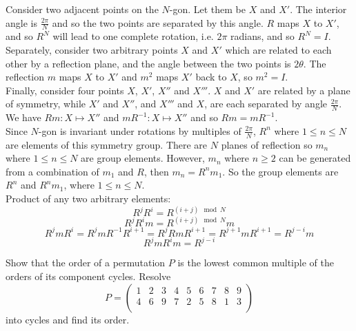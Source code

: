 \documentclass[a4paper]{article}
\begin{document}
\begin{ans}
Consider two adjacent points on the $N$-gon. Let them be $X$ and $X'$. The interior angle is $\frac{2\pi}{N}$ and so the two points are separated by this angle. $R$ maps $X$ to $X'$, and so $R^N$ will lead to one complete rotation, i.e. $2\pi$ radians, and so $R^N=I$.\\[5pt]
Separately, consider two arbitrary points $X$ and $X'$ which are related to each other by a reflection plane, and the angle between the two points is $2\theta$. The reflection $m$ maps $X$ to $X'$ and $m^2$ maps $X'$ back to $X$, so $m^2=I$.\\[5pt]
Finally, consider four points $X$, $X'$, $X''$ and $X'''$. $X$ and $X'$ are related by a plane of symmetry, while $X'$ and $X''$, and $X'''$ and $X$, are each separated by angle $\frac{2\pi}{N}$. We have $Rm: X\mapsto X''$ and $mR^{-1}:X\mapsto X''$ and so $Rm=mR^{-1}$.\\[5pt]
Since $N$-gon is invariant under rotations by multiples of $\frac{2\pi}{N}$, $R^n$ where $1\leq n\leq N$ are elements of this symmetry group. There are $N$ planes of reflection so $m_n$ where $1\leq n\leq N$ are group elements. However, $m_n$ where $n\geq2$ can be generated from a combination of $m_1$ and $R$, then $m_n=R^nm_1$. So the group elements are $R^n$ and $R^nm_1$, where $1\leq n\leq N$.\\[5pt]
Product of any two arbitrary elements: 
$$R^jR^i=R^{(i+j)\mod N}$$
$$R^jR^im=R^{(i+j)\mod N}m$$
$$R^jmR^i=R^jmR^{-1}R^{i+1}=R^jRmR^{i+1}=R^{j+1}mR^{i+1}=R^{j-i}m$$
$$R^jmR^im=R^{j-i}$$
\end{ans}
\begin{qns}[Permutation]
Show that the order of a permutation $P$ is the lowest common multiple of the orders of its component cycles. Resolve
$$P=\begin{pmatrix}1&2&3&4&5&6&7&8&9\\4&6&9&7&2&5&8&1&3\\\end{pmatrix}$$
into cycles and find its order.
\end{qns}
\end{document}
